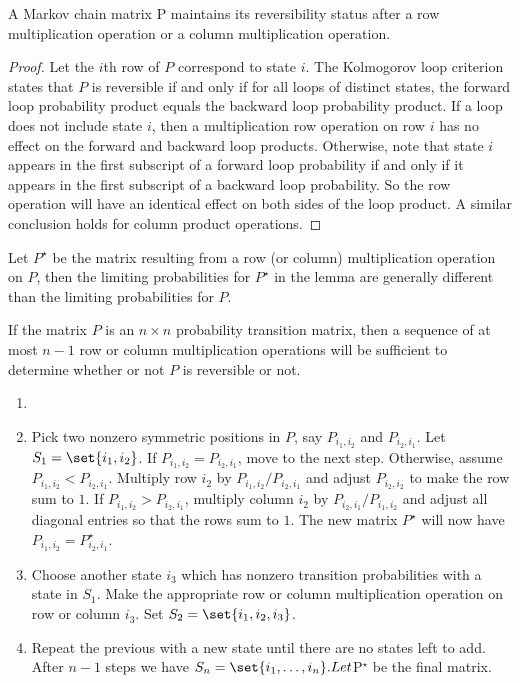 \documentclass[12pt]{article}
\begin{document}
\begin{lemma}
  A Markov chain matrix P maintains its reversibility status after
a row multiplication operation or a column multiplication operation.
\end{lemma}

\begin{proof}
  Let the $i$th row of $P$ correspond to state $i$. The Kolmogorov
  loop criterion states
that $P$ is reversible if and only if for all loops of distinct states, the forward loop probability
product equals the backward loop probability product. If a loop does not include
state $i$, then a multiplication row operation on row $i$ has no effect on
the forward
and backward loop products. Otherwise, note that state $i$ appears in the first
subscript of a forward loop probability if and only if it appears in the first subscript of a
backward loop probability. So the row operation will have an identical effect on
both sides of the loop product. A similar conclusion holds for column product
operations.
\end{proof}

\begin{remark}
  Let $P^{\star}$ be the matrix resulting from a row (or column) multiplication operation on $P$, then the limiting probabilities for $P^{\star}$ in the lemma
are generally different than the limiting probabilities for $P$. 
\end{remark}

If the matrix $P$ is an $n \times n$ probability transition matrix, then a sequence of at
most $n −1$ row or column multiplication operations will be sufficient to determine
whether or not $P$ is reversible or not.
\begin{enumerate}
\item 
\item Pick two nonzero symmetric positions in $P$, say $P_{i_1,i_2}$ and $P_{i_2,i_1}$. Let $S_1 =
\set{i_1, i_2}$. If $P_{i_1,i_2} = P_{i_2,i_1}$, move to the next step. Otherwise, assume $P_{i_1,i_2 }< P_{i_2,i_1}$.
Multiply row $i_2$ by $P_{i_1,i_2}/P_{i_2,i_1}$ and adjust $P_{i_2,i_2}$ to make the row sum to $1$. If
$P_{i_1,i_2} > P_{i_2,i_1}$, multiply column $i_2$ by $P_{i_2,i_1}/P_{i_1,i_2}$ and adjust all diagonal entries so
that the rows sum to $1$. The new matrix $P^{\star}$ will now have $P_{i_1,i_2} = P_{i_2,i_1}^{\star}$.
\item Choose another state $i_3$ which has nonzero transition probabilities with a state
in $S_1$. Make the appropriate row or column multiplication operation on row or
column $i_3$. Set $S_2 = \set{i_1, i_2, i_3}$.
\item  Repeat the previous with a new state until there are no states left to add. After $n −1$
steps we have $S_n = \set{i_1, \dots, i_n}. Let $P$^{\star}$ be the
final matrix.
\end{enumerate}
\end{document}
